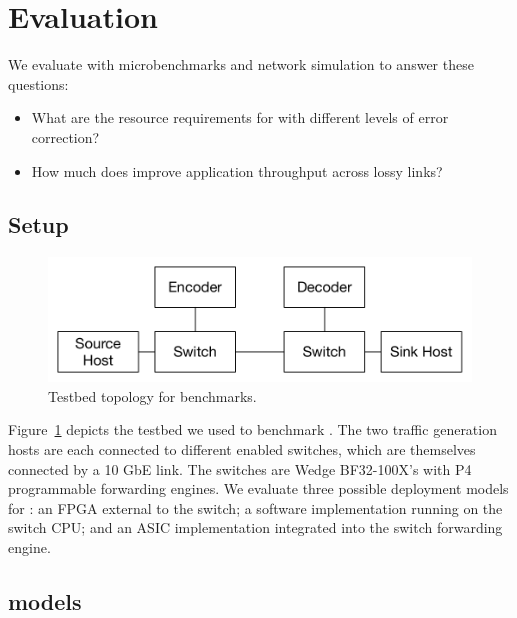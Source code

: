 \section{Evaluation}
\label{sec:evaluation}

We evaluate \OurSys with microbenchmarks and network simulation to answer these questions:
\begin{itemize}

\item What are the resource requirements for \OurSys with different levels of 
error correction?

\item How much does \OurSys improve application throughput across lossy links?

\end{itemize}

\subsection{Setup}
\begin{figure}
  \centering
  \includegraphics[width=0.3\paperwidth]{exp_topo.pdf}
  \caption{\label{fig:exp_topo} Testbed topology for benchmarks.}
\end{figure}

Figure~\ref{fig:exp_topo} depicts the testbed we used to benchmark \OurSys.
The two traffic generation hosts are each connected to different \OurSys
enabled switches, which are themselves connected by a 10 GbE link. The
switches are Wedge BF32-100X's with P4 programmable forwarding engines. We
evaluate three possible deployment models for \OurSys: an FPGA external to
the switch; a software implementation running on the switch CPU; and an ASIC  
implementation integrated into the switch forwarding engine. 

\subsection{\OurSys models}
